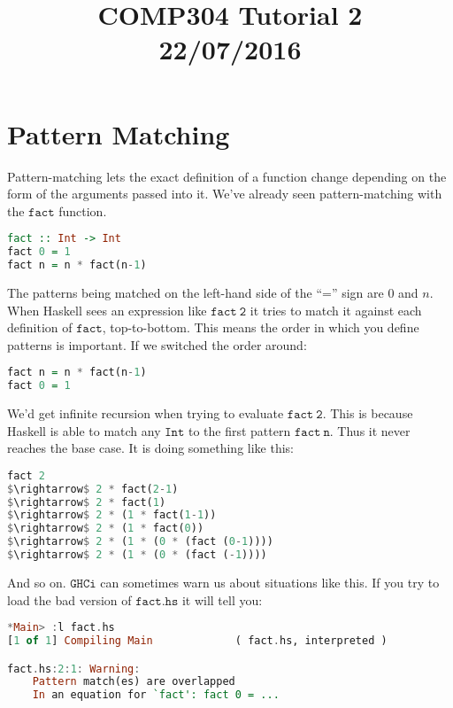 \documentclass[a4paper,12pt]{article}
\newcommand{\keywadj}[1]{\mathtt{#1}}
\begin{document}
\title{COMP304 Tutorial 2 \\ 22/07/2016}
\date{}
\maketitle

\noindent
\section{Pattern Matching}

\noindent
Pattern-matching lets the exact definition of a function change depending on the form of the arguments passed into it. We've already seen pattern-matching with the $\keywadj{fact}$ function.

\begin{lstlisting}[language=Haskell]
fact :: Int -> Int
fact 0 = 1
fact n = n * fact(n-1)
\end{lstlisting}

\noindent
The patterns being matched on the left-hand side of the ``='' sign are $0$ and $n$. When Haskell sees an expression like $\keywadj{fact~2}$ it tries to match it against each definition of $\keywadj{fact}$, top-to-bottom. This means the order in which you define patterns is important. If we switched the order around:

\begin{lstlisting}[language=Haskell]
fact n = n * fact(n-1)
fact 0 = 1
\end{lstlisting}

\noindent
We'd get infinite recursion when trying to evaluate $\keywadj{fact~2}$. This is because Haskell is able to match any $\keywadj{Int}$ to the first pattern $\keywadj{fact~n}$. Thus it never reaches the base case. It is doing something like this:

\begin{lstlisting}[language=Haskell]
fact 2
$\rightarrow$ 2 * fact(2-1)
$\rightarrow$ 2 * fact(1)
$\rightarrow$ 2 * (1 * fact(1-1))
$\rightarrow$ 2 * (1 * fact(0))
$\rightarrow$ 2 * (1 * (0 * (fact (0-1))))
$\rightarrow$ 2 * (1 * (0 * (fact (-1))))
\end{lstlisting}

\noindent
And so on. $\keywadj{GHCi}$ can sometimes warn us about situations like this. If you try to load the bad version of $\keywadj{fact.hs}$ it will tell you:

\begin{lstlisting}[language=Haskell]
*Main> :l fact.hs
[1 of 1] Compiling Main             ( fact.hs, interpreted )

fact.hs:2:1: Warning:
    Pattern match(es) are overlapped
    In an equation for `fact': fact 0 = ...
\end{lstlisting}
\end{document}
